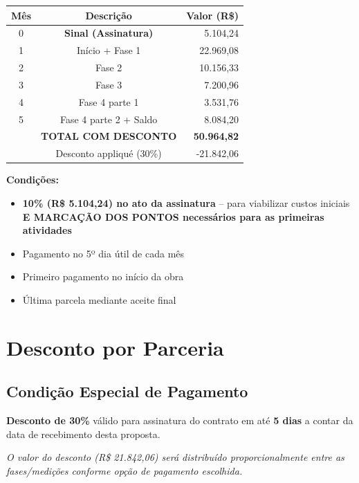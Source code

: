 \documentclass[12pt,a4paper]{article}
\renewenvironment{table}%
{\begin{center}%
\scriptsize%
\addtolength{\tabcolsep}{-2pt}%
}%
{\end{center}}
\begin{document}
\begin{table}
\centering
\begin{tabular}{ccr}
\toprule
\textbf{Mês} & \textbf{Descrição} & \textbf{Valor (R\$)} \\
\midrule
0 & \textbf{Sinal (Assinatura)} & 5.104,24 \\
1 & Início + Fase 1 & 22.969,08 \\
2 & Fase 2 & 10.156,33 \\
3 & Fase 3 & 7.200,96 \\
4 & Fase 4 parte 1 & 3.531,76 \\
5 & Fase 4 parte 2 + Saldo & 8.084,20 \\
\midrule
 & \textbf{TOTAL COM DESCONTO} & \textbf{50.964,82} \\
 & Desconto appliqué (30\%) & -21.842,06 \\
\bottomrule
\end{tabular}
\end{table}

\noindent\textbf{Condições:}
\begin{itemize}
\item \textbf{10\% (R\$ 5.104,24) no ato da assinatura} -- para viabilizar custos iniciais \textbf{E MARCAÇÃO DOS PONTOS necessários para as primeiras atividades}
\item Pagamento no 5º dia útil de cada mês
\item Primeiro pagamento no início da obra
\item Última parcela mediante aceite final
\end{itemize}

\pagebreak

\section{Desconto por Parceria}

\subsection{Condição Especial de Pagamento}

\textbf{Desconto de 30\%} válido para assinatura do contrato em até \textbf{5 dias} a contar da data de recebimento desta proposta.

\noindent\textit{O valor do desconto (R\$ 21.842,06) será distribuído proporcionalmente entre as fases/medições conforme opção de pagamento escolhida.}
\end{document}
